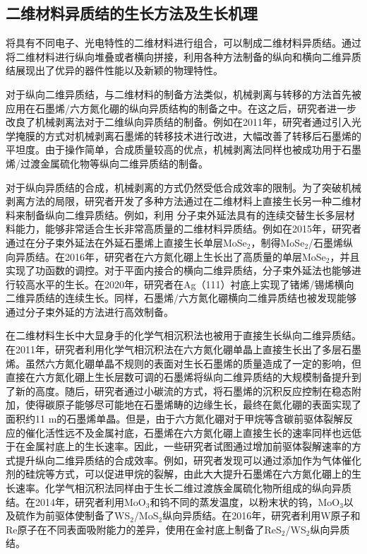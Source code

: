 
\subsection{二维材料异质结的生长方法及生长机理}
将具有不同电子、光电特性的二维材料进行组合，可以制成二维材料异质结。通过将二维材料进行纵向堆叠或者横向拼接，利用各种方法制备的纵向和横向二维异质结展现出了优异的器件性能以及新颖的物理特性。

对于纵向二维异质结，与二维材料的制备方法类似，机械剥离与转移的方法首先被应用在石墨烯/六方氮化硼的纵向异质结构的制备之中。在这之后，研究者进一步改良了机械剥离法对于二维纵向异质结的制备。例如在2011年，研究者通过引入光学掩膜的方式对机械剥离石墨烯的转移技术进行改进，大幅改善了转移后石墨烯的平坦度。由于操作简单，合成质量较高的优点，机械剥离法同样也被成功用于石墨烯/过渡金属硫化物等纵向二维异质结的制备。

对于纵向异质结的合成，机械剥离的方式仍然受低合成效率的限制。为了突破机械剥离方法的局限，研究者开发了多种方法通过在二维材料上直接生长另一种二维材料来制备纵向二维异质结。例如，利用
分子束外延法具有的连续交替生长多层材料能力，能够非常适合生长非常高质量的二维材料异质结。例如在2015年，研究者通过在分子束外延法在外延石墨烯上直接生长单层MoSe$_2$，制得MoSe$_2$/石墨烯纵向异质结。在2016年，研究者在六方氮化硼上生长出了高质量的单层MoSe$_2$，并且实现了功函数的调控。对于平面内接合的横向二维异质结，分子束外延法也能够进行较高水平的生长。在2020年，研究者在Ag（111）衬底上实现了锗烯/锡烯横向二维异质结的连续生长。同样，石墨烯/六方氮化硼横向二维异质结也被发现能够通过分子束外延的方法进行高效制备。

在二维材料生长中大显身手的化学气相沉积法也被用于直接生长纵向二维异质结。在2011年，研究者利用化学气相沉积法在六方氮化硼单晶上直接生长出了多层石墨烯。虽然六方氮化硼单晶不规则的表面对生长石墨烯的质量造成了一定的影响，但直接在六方氮化硼上生长层数可调的石墨烯将纵向二维异质结的大规模制备提升到了新的高度。随后，研究者通过小碳流的方式，将石墨烯的沉积反应控制在稳态附加，使得碳原子能够尽可能地在石墨烯畴的边缘生长，最终在氮化硼的表面实现了面积约11 \textmu m的石墨烯单晶。但是，由于六方氮化硼对于甲烷等含碳前驱体裂解反应的催化活性远不及金属衬底，石墨烯在六方氮化硼上直接生长的速率同样也远低于在金属衬底上的生长速率。因此，一些研究者试图通过增加前驱体裂解速率的方式提升纵向二维异质结的合成效率。例如，研究者发现可以通过添加作为气体催化剂的硅烷等方式，可以促进甲烷的裂解，由此大大提升石墨烯在六方氮化硼上的生长速率。化学气相沉积法同样由于生长二维过渡族金属硫化物所组成的纵向异质结。在2014年，研究者利用MoO$_3$和钨不同的蒸发温度，以粉末状的钨，MoO$_3$以及硫作为前驱体使制备了WS$_2$/MoS$_2$纵向异质结。在2016年，研究者利用W原子和Re原子在不同表面吸附能力的差异，使用在金衬底上制备了ReS$_2$/WS$_2$纵向异质结。

